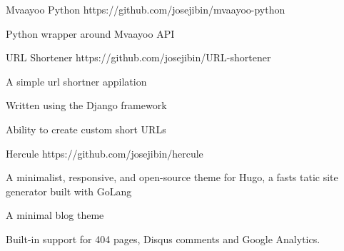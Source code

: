 

\begin{cvprojects}

\cvproject
    {Mvaayoo Python} %
    {https://github.com/josejibin/mvaayoo-python} %
    {
      \begin{cvitems} %
        \item{Python wrapper around Mvaayoo API}
      \end{cvitems}
    }


\cvproject
    {URL Shortener} %
    {https://github.com/josejibin/URL-shortener} %
    {
      \begin{cvitems} %
        \item{A simple url shortner appilation}
        \item {Written using the Django framework}
        \item {Ability to create custom short URLs}
      \end{cvitems}
    }

\cvproject
    {Hercule} %
    {https://github.com/josejibin/hercule} %
    {
      \begin{cvitems} %
        \item{A minimalist, responsive, and open-source theme for Hugo, a fasts tatic site generator built with GoLang}
        \item {A minimal blog theme }
        \item {Built-in support for 404 pages, Disqus comments and Google Analytics.}
      \end{cvitems}
    }






\end{cvprojects}
